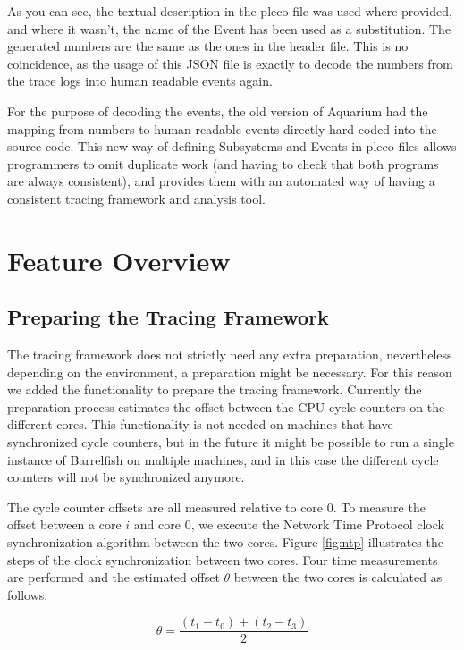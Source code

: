 \documentclass[a4paper,11pt,twoside]{report}
\begin{document}
As you can see, the textual description in the pleco file was used where
provided, and where it wasn't, the name of the Event has been used as a
substitution. The generated numbers are the same as the ones in the header file.
This is no coincidence, as the usage of this JSON file is exactly to decode the
numbers from the trace logs into human readable events again.

For the purpose of decoding the events, the old version of Aquarium had the
mapping from numbers to human readable events directly hard coded into the
source code. This new way of defining Subsystems and Events in pleco files
allows programmers to omit duplicate work (and having to check that both programs
are always consistent), and provides them with an automated way of having a
consistent tracing framework and analysis tool.

\section{Feature Overview}
\subsection{Preparing the Tracing Framework\label{sec:preparing}}

The tracing framework does not strictly need any extra preparation, nevertheless
depending on the environment, a preparation might be necessary. For this reason
we added the functionality to prepare the tracing framework. Currently the
preparation process estimates the offset between the CPU cycle counters on the
different cores. This functionality is not needed on machines that have
synchronized cycle counters, but in the future it might be possible to run a
single instance of Barrelfish on multiple machines, and in this case the
different cycle counters will not be synchronized anymore.

The cycle counter offsets are all measured relative to core $0$. To measure the
offset between a core $i$ and core $0$, we execute the Network Time Protocol
clock synchronization algorithm
between the two cores. Figure \ref{fig:ntp} illustrates the steps of the clock
synchronization between two cores. Four time measurements are performed and the
estimated offset $\theta$ between the two cores is calculated as follows:

\begin{equation}
	\theta =  \frac{(t_1-t_0)+(t_2-t_3)}{2}
\end{equation}
\end{document}
